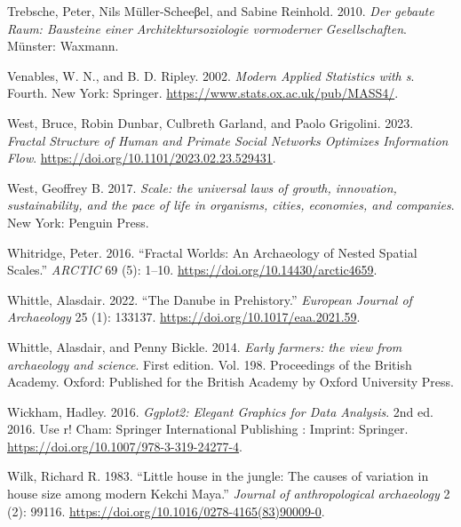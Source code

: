 \documentclass[
  12pt,
  a4paper, twoside]{book}
\newlength{\cslhangindent}
\newlength{\cslentryspacingunit} %
\newenvironment{CSLReferences}[2] %
 {%
  \setlength{\parindent}{0pt}
  \ifodd #1
  \let\oldpar\par
  \def\par{\hangindent=\cslhangindent\oldpar}
  \fi
  \setlength{\parskip}{#2\cslentryspacingunit}
 }%
 {}
\begin{document}
\begin{CSLReferences}{1}{0}
\leavevmode{}%
Trebsche, Peter, Nils Müller-Scheeβel, and Sabine Reinhold. 2010. \emph{Der gebaute Raum: Bausteine einer Architektursoziologie vormoderner Gesellschaften}. Münster: Waxmann.

\leavevmode{}%
Venables, W. N., and B. D. Ripley. 2002. \emph{Modern Applied Statistics with s}. Fourth. New York: Springer. \url{https://www.stats.ox.ac.uk/pub/MASS4/}.

\leavevmode{}%
West, Bruce, Robin Dunbar, Culbreth Garland, and Paolo Grigolini. 2023. \emph{Fractal Structure of Human and Primate Social Networks Optimizes Information Flow}. \url{https://doi.org/10.1101/2023.02.23.529431}.

\leavevmode{}%
West, Geoffrey B. 2017. \emph{Scale: the universal laws of growth, innovation, sustainability, and the pace of life in organisms, cities, economies, and companies}. New York: Penguin Press.

\leavevmode{}%
Whitridge, Peter. 2016. {``Fractal Worlds: An Archaeology of Nested Spatial Scales.''} \emph{ARCTIC} 69 (5): 1--10. \url{https://doi.org/10.14430/arctic4659}.

\leavevmode{}%
Whittle, Alasdair. 2022. {``The Danube in Prehistory.''} \emph{European Journal of Archaeology} 25 (1): 133137. \url{https://doi.org/10.1017/eaa.2021.59}.

\leavevmode{}%
Whittle, Alasdair, and Penny Bickle. 2014. \emph{Early farmers: the view from archaeology and science}. First edition. Vol. 198. Proceedings of the British Academy. Oxford: Published for the British Academy by Oxford University Press.

\leavevmode{}%
Wickham, Hadley. 2016. \emph{Ggplot2: Elegant Graphics for Data Analysis}. 2nd ed. 2016. Use r! Cham: Springer International Publishing : Imprint: Springer. \url{https://doi.org/10.1007/978-3-319-24277-4}.

\leavevmode{}%
Wilk, Richard R. 1983. {``Little house in the jungle: The causes of variation in house size among modern Kekchi Maya.''} \emph{Journal of anthropological archaeology} 2 (2): 99116. \url{https://doi.org/10.1016/0278-4165(83)90009-0}.


\end{CSLReferences}
\end{document}
